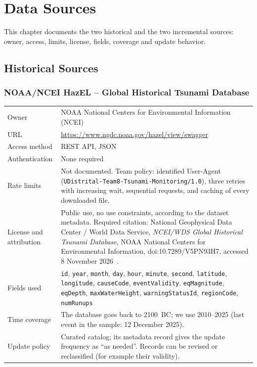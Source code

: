 \documentclass[a4paper,11pt,oneside]{book}
\begin{document}
\chapter{Data Sources}
\label{ch:sources}
This chapter documents the two historical and the two incremental sources: owner, access, limits, license, fields, coverage and update behavior.

\section{Historical Sources}
\label{sec:historical}

\subsection{NOAA/NCEI HazEL -- Global Historical Tsunami Database}
\noindent\begin{tabularx}{\textwidth}{@{}lX@{}}
\toprule
Owner & NOAA National Centers for Environmental Information (NCEI) \\
URL & \url{https://www.ngdc.noaa.gov/hazel/view/swagger} \\
Access method & REST API, JSON \\
Authentication & None required \\
Rate limits & Not documented. Team policy: identified User-Agent (\texttt{UDistrital-Team8-Tsunami-Monitoring/1.0}), three retries with increasing wait, sequential requests, and caching of every downloaded file. \\
License and attribution & Public use, no use constraints, according to the dataset metadata. Required citation: National Geophysical Data Center / World Data Service, \emph{NCEI/WDS Global Historical Tsunami Database}, NOAA National Centers for Environmental Information, doi:10.7289/V5PN93H7, accessed 8 November 2026~\cite{hazel}. \\
Fields used & \texttt{id}, \texttt{year}, \texttt{month}, \texttt{day}, \texttt{hour}, \texttt{minute}, \texttt{second}, \texttt{latitude}, \texttt{longitude}, \texttt{causeCode}, \texttt{eventValidity}, \texttt{eqMagnitude}, \texttt{eqDepth}, \texttt{maxWaterHeight}, \texttt{warningStatusId}, \texttt{regionCode}, \texttt{numRunups} \\
Time coverage & The database goes back to 2100~BC; we use 2010--2025 (last event in the sample: 12 December 2025). \\
Update policy & Curated catalog; its metadata record gives the update frequency as ``as needed''. Records can be revised or reclassified (for example their validity). \\
\bottomrule
\end{tabularx}
\end{document}
